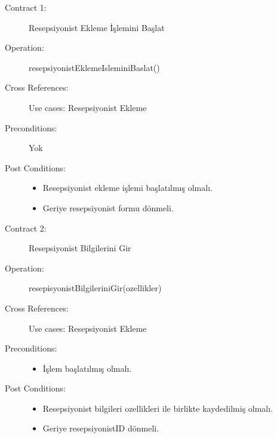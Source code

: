 \documentclass[12pt,a4paper]{report}
\begin{document}
\newpage


\begin{description}
\item[Contract 1:] Resepsiyonist Ekleme İşlemini Başlat
\item[Operation:] resepsiyonistEklemeIsleminiBaslat()
\item[Cross References:] Use cases: Resepsiyonist Ekleme
\item[Preconditions:] Yok
\item[Post Conditions:] \hspace{10 mm}
\begin{itemize} 
\item Resepsiyonist ekleme işlemi başlatılmış olmalı.
\item Geriye resepsiyonist formu dönmeli. \\
\end{itemize}
\end{description}

\begin{description}
\item[Contract 2:] Resepsiyonist Bilgilerini Gir
\item[Operation:] resepisyonistBilgileriniGir(ozellikler)
\item[Cross References:] Use cases: Resepsiyonist Ekleme
\item[Preconditions:] \hspace{10 mm}
\begin{itemize}
\item İşlem başlatılmış olmalı.
\end{itemize}
\item[Post Conditions:] \hspace{10 mm}
\begin{itemize} 
\item Resepsiyonist bilgileri ozellikleri ile birlikte kaydedilmiş olmalı.
\item Geriye resepsiyonistID dönmeli. \\
\end{itemize}
\end{description}
\end{document}
